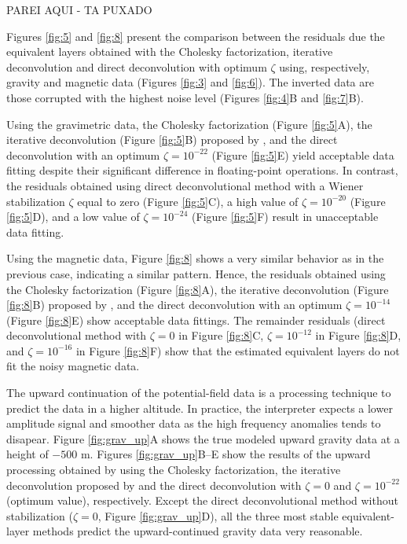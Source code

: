 PAREI AQUI - TA PUXADO

Figures \ref{fig:5} and \ref{fig:8} present the comparison between the residuals due the equivalent layers obtained with the Cholesky factorization, 
iterative deconvolution and direct deconvolution with optimum $\zeta$ using, respectively, gravity and magnetic data (Figures \ref{fig:3} and \ref{fig:6}).
The inverted data are those corrupted with the highest noise level (Figures \ref{fig:4}B and \ref{fig:7}B).

Using the gravimetric data, the Cholesky factorization (Figure \ref{fig:5}A), the iterative deconvolution (Figure \ref{fig:5}B) proposed by \cite{takahashi-etal2020}, and the direct deconvolution with an optimum $\zeta = 10^{-22}$ (Figure \ref{fig:5}E) yield acceptable data fitting despite their significant difference in floating-point operations.
In contrast, the residuals obtained using direct deconvolutional method with a Wiener stabilization  $\zeta$ equal to 
zero (Figure \ref{fig:5}C), 
a high value of $\zeta = 10^{-20}$ (Figure \ref{fig:5}D), and 
a low value of  $\zeta = 10^{-24}$ (Figure \ref{fig:5}F)
result in unacceptable data fitting.

Using the magnetic data, Figure \ref{fig:8} shows a very similar behavior 
as in the previous case, indicating a similar pattern.
Hence, the residuals obtained using the Cholesky factorization 
(Figure \ref{fig:8}A), the iterative deconvolution (Figure \ref{fig:8}B) proposed by \cite{takahashi-etal2020}, and the direct deconvolution with an optimum $\zeta = 10^{-14}$ (Figure \ref{fig:8}E) show acceptable data fittings. 
The remainder residuals (direct deconvolutional method with $\zeta =0$ 
in Figure \ref{fig:8}C, $\zeta = 10^{-12}$ in Figure \ref{fig:8}D, and 
$\zeta = 10^{-16}$ in Figure \ref{fig:8}F) show that the estimated equivalent layers do not fit the noisy magnetic data.

The upward continuation of the potential-field data is a processing technique to predict the data in a higher altitude. 
In practice, the interpreter expects a lower amplitude signal and smoother data as the high frequency anomalies tends to disapear. 
Figure  \ref{fig:grav_up}A shows the true modeled upward gravity data at a height of $-500$ m. 
Figures \ref{fig:grav_up}B--E show the results of the upward processing obtained by using the Cholesky factorization,  the iterative deconvolution proposed by \cite{takahashi-etal2020} and the direct deconvolution with $\zeta = 0$ and $\zeta = 10^{-22}$ (optimum value), respectively.
Except the direct deconvolutional method without stabilization ($\zeta = 0$, Figure \ref{fig:grav_up}D), all the three most stable equivalent-layer methods predict the upward-continued gravity data very reasonable.

